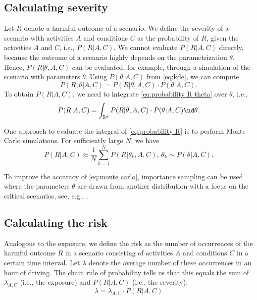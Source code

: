 \subsection{Calculating severity}
\label{sec:simulations}

Let $R$ denote a harmful outcome of a scenario. We define the severity of a scenario with activities $A$ and conditions $C$ as the probability of $R$, given the activities $A$ and $C$, i.e., $P(R|A,C)$. We cannot evaluate $P(R|A,C)$ directly, because the outcome of a scenario highly depends on the parametrization $\theta$. Hence, $P(R|\theta,A,C)$ can be evaluated, for example, through a simulation of the scenario with parameters $\theta$. Using $P(\theta|A,C)$ from \cref{eq:kde}, we can compute 
\begin{equation} \label{eq:probability R theta}
	P(R,\theta|A,C) = P(R|\theta,A,C) \cdot P(\theta|A,C).
\end{equation}
To obtain $P(R|A,C)$, we need to integrate \cref{eq:probability R theta} over $\theta$, i.e., 
\begin{equation} \label{eq:probability R}
	P(R|A,C) = \int_{\mathbb{R}^d} P(R|\theta,A,C) \cdot P(\theta|A,C) \ud \theta.
\end{equation}

One approach to evaluate the integral of \cref{eq:probability R} is to perform Monte Carlo simulations. For sufficiently large $N$, we have
\begin{equation} \label{eq:monte carlo}
	P(R|A,C) \approx \frac{1}{N} \sum_{k=1}^N P(R|\theta_k,A,C), \, \theta_k \sim P(\theta|A,C).
\end{equation}

To improve the accuracy of \cref{eq:monte carlo}, importance sampling can be used where the parameters $\theta$ are drawn from another distribution with a focus on the critical scenarios, see, e.g., \cite{deGelder2017assessment}.



\subsection{Calculating the risk}
\label{sec:risk}

Analogous to the exposure, we define the risk as the number of occurrences of the harmful outcome $R$ in a scenario consisting of activities $A$ and conditions $C$ in a certain time interval. Let $\lambda$ denote the average number of these occurrences in an hour of driving. The chain rule of probability tells us that this equals the sum of $\lambda_{A,C}$ (i.e., the exposure) and $P(R|A,C)$ (i.e., the severity):
\begin{equation} \label{eq:risk}
	\lambda = \lambda_{A,C} \cdot P(R|A,C)
\end{equation}

